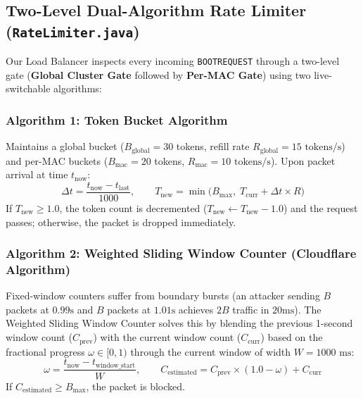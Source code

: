 \documentclass[11pt,a4paper]{article}
\begin{document}
\subsection{Two-Level Dual-Algorithm Rate Limiter (\texttt{RateLimiter.java})}
Our Load Balancer inspects every incoming \texttt{BOOTREQUEST} through a two-level gate (\textbf{Global Cluster Gate} followed by \textbf{Per-MAC Gate}) using two live-switchable algorithms:

\subsubsection{Algorithm 1: Token Bucket Algorithm}
Maintains a global bucket ($B_{\text{global}} = 30$ tokens, refill rate $R_{\text{global}} = 15\text{ tokens/s}$) and per-MAC buckets ($B_{\text{mac}} = 20$ tokens, $R_{\text{mac}} = 10\text{ tokens/s}$). Upon packet arrival at time $t_{\text{now}}$:
\[
\Delta t = \frac{t_{\text{now}} - t_{\text{last}}}{1000}, \qquad T_{\text{new}} = \min\!\Big(B_{\max},\; T_{\text{curr}} + \Delta t \times R\Big)
\]
If $T_{\text{new}} \ge 1.0$, the token count is decremented ($T_{\text{new}} \leftarrow T_{\text{new}} - 1.0$) and the request passes; otherwise, the packet is dropped immediately.

\subsubsection{Algorithm 2: Weighted Sliding Window Counter (Cloudflare Algorithm)}
Fixed-window counters suffer from boundary bursts (an attacker sending $B$ packets at $0.99\text{s}$ and $B$ packets at $1.01\text{s}$ achieves $2B$ traffic in $20\text{ms}$). The Weighted Sliding Window Counter solves this by blending the previous 1-second window count ($C_{\text{prev}}$) with the current window count ($C_{\text{curr}}$) based on the fractional progress $\omega \in [0, 1)$ through the current window of width $W = 1000\text{ ms}$:
\[
\omega = \frac{t_{\text{now}} - t_{\text{window\_start}}}{W}, \qquad C_{\text{estimated}} = C_{\text{prev}} \times (1.0 - \omega) + C_{\text{curr}}
\]
If $C_{\text{estimated}} \ge B_{\max}$, the packet is blocked.
\end{document}
